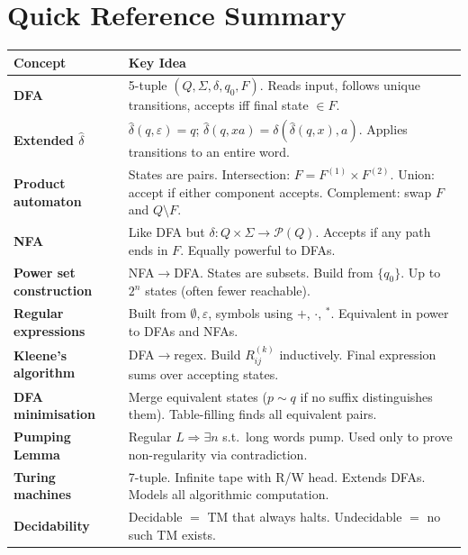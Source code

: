 \documentclass[11pt, a4paper]{article}
\theoremstyle{definition}
\theoremstyle{remark}
\newcommand{\hatdelta}{\widehat{\delta}}
\begin{document}
\section*{Quick Reference Summary}

\begin{center}
\renewcommand{\arraystretch}{1.4}
\begin{tabular}{>{\bfseries}p{4cm} p{9.5cm}}
  \toprule
  Concept & Key Idea \\
  \midrule
  DFA &
    5-tuple $(Q,\Sigma,\delta,q_0,F)$.  Reads input, follows unique transitions,
    accepts iff final state $\in F$. \\
  Extended $\hatdelta$ &
    $\hatdelta(q,\varepsilon)=q$;\;
    $\hatdelta(q,xa)=\delta(\hatdelta(q,x),a)$.
    Applies transitions to an entire word. \\
  Product automaton &
    States are pairs.  Intersection: $F=F^{(1)}\times F^{(2)}$.
    Union: accept if either component accepts.
    Complement: swap $F$ and $Q\setminus F$. \\
  NFA &
    Like DFA but $\delta:Q\times\Sigma\to\mathcal{P}(Q)$.
    Accepts if any path ends in $F$.  Equally powerful to DFAs. \\
  Power set construction &
    NFA$\to$DFA.  States are subsets.  Build from $\{q_0\}$.
    Up to $2^n$ states (often fewer reachable). \\
  Regular expressions &
    Built from $\emptyset,\varepsilon$, symbols using $+$, $\cdot$, ${}^*$.
    Equivalent in power to DFAs and NFAs. \\
  Kleene's algorithm &
    DFA$\to$regex.  Build $R^{(k)}_{ij}$ inductively.
    Final expression sums over accepting states. \\
  DFA minimisation &
    Merge equivalent states ($p\sim q$ if no suffix distinguishes them).
    Table-filling finds all equivalent pairs. \\
  Pumping Lemma &
    Regular $L\Rightarrow\exists n$ s.t.\ long words pump.
    Used only to prove non-regularity via contradiction. \\
    Turing machines &
    7-tuple.  Infinite tape with R/W head.
    Extends DFAs.  Models all algorithmic computation. \\
  Decidability &
    Decidable $=$ TM that always halts.
    Undecidable $=$ no such TM exists. \\

\end{tabular}
\end{center}
\end{document}

